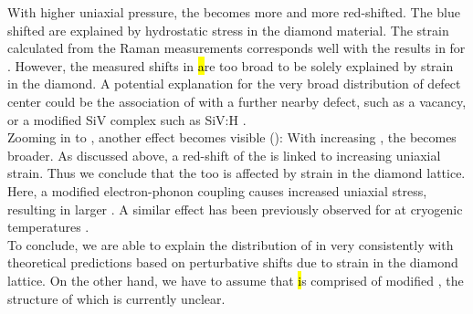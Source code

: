 	With higher uniaxial pressure, the \ZPL becomes more and more red-shifted.
	The blue shifted \ZPL \cwls are explained by hydrostatic stress in the diamond material.
	The strain calculated from the Raman measurements corresponds well with the results in  for \vl.
	However, the measured shifts in \hl are too broad to be solely explained by strain in the diamond.
	A potential explanation for the very broad distribution of defect center \ZPL \cwls could be the association of \sivs with a further nearby defect, such as a vacancy, or a modified SiV complex such as SiV:H \cite{Thiering2015}.
	\\
	Zooming in to \vl, another effect becomes visible ():
	With increasing  \ZPL \cwl, the \lw becomes broader.
	As discussed above, a red-shift of the \ZPL is linked to increasing uniaxial strain.
	Thus we conclude that the \ZPL \lw too is affected by strain in the diamond lattice.
	Here, a modified electron-phonon coupling \cite{Jahnke2015a} causes increased uniaxial stress, resulting in larger \lws.
	A similar effect has been previously observed for \sivs at cryogenic temperatures \cite{Arend2016a}.
	\\
	To conclude, we are able to explain the distribution of \ZPL \cwls in \vl very consistently with theoretical predictions based on perturbative shifts due to strain in the diamond lattice.
	On the other hand, we have to assume that \hl is comprised of modified \sivs, the structure of which is currently unclear.
